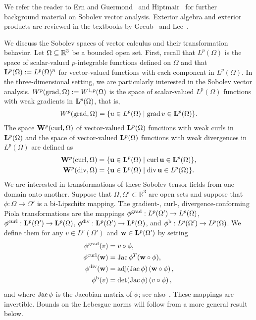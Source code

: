 \documentclass[10pt,letterpaper]{article}
\begin{document}
We refer the reader to Ern and Guermond~\cite{ern2021finite} and Hiptmair~\cite{hiptmair2002finite} for further background material on Sobolev vector analysis. 
Exterior algebra and exterior products are reviewed in the textbooks by Greub~\cite{greub1967multilinear} and Lee~\cite{lee2012smooth}.

We discuss the Sobolev spaces of vector calculus and their transformation behavior. 
Let $\Omega \subseteq {\mathbb R}^{3}$ be a bounded open set. 
First, recall that $L^{p}(\Omega)$ is the space of scalar-valued $p$-integrable functions defined on $\Omega$
and that ${\mathbf L}^{p}(\Omega) := L^{p}(\Omega)^{n}$ for vector-valued functions with each component in $L^{p}(\Omega)$. 
In the three-dimensional setting, we are particularly interested in the Sobolev vector analysis. 
$W^{p}(\operatorname{grad},\Omega) := W^{1,p}(\Omega)$ is the space of scalar-valued $L^{p}(\Omega)$ functions with weak gradients in ${\mathbf L}^{p}(\Omega)$, that is,  
\begin{gather*}
    W^{p}(\grad,\Omega) = \{ u \in L^{p}(\Omega) \suchthat \grad v \in \bfL^{p}(\Omega) \}
    .
\end{gather*}
The space ${\mathbf W}^{p}(\operatorname{curl},\Omega)$ of vector-valued ${\mathbf L}^{p}(\Omega)$ functions with weak curls in ${\mathbf L}^{p}(\Omega)$
and the space of vector-valued ${\mathbf L}^{p}(\Omega)$ functions with weak divergences in $L^{p}(\Omega)$ are defined as 
\begin{gather*}
    \bfW^{p}(\curl,\Omega) = \{ \bfu \in \bfL^{p}(\Omega) \suchthat \curl \bfu \in \bfL^{p}(\Omega) \},
    \\ 
    \bfW^{p}(\divergence,\Omega) = \{ \bfu \in \bfL^{p}(\Omega) \suchthat \divergence \bfu \in L^{p}(\Omega) \}.
\end{gather*}
We are interested in transformations of these Sobolev tensor fields from one domain onto another. 
Suppose that $\Omega, \Omega' \subset \mathbb{R}^3$ are open sets and suppose that $\phi: \Omega \to \Omega'$ is a bi-Lipschitz mapping.
The gradient-, curl-, divergence-conforming Piola transformations are the mappings 
$\phi^{\operatorname{grad}}: L^{p}(\Omega') \to L^{p}(\Omega)$,
$\phi^{\operatorname{curl}}: {\mathbf L}^{p}(\Omega') \to {\mathbf L}^{p}(\Omega)$, 
$\phi^{\operatorname{div}}: {\mathbf L}^{p}(\Omega') \to {\mathbf L}^{p}(\Omega)$,
and
$\phi^{\rm b}: L^{p}(\Omega') \to L^{p}(\Omega)$. 
We define them 
for any $v \in L^{p}(\Omega')$ and ${\mathbf w} \in {\mathbf L}^{p}(\Omega')$ by setting 
\begin{subequations}\label{eq_definition_piola}
\begin{align*}
    \phi^{\operatorname{grad}}(v) &= v \circ \phi, \\
    \phi^{\operatorname{curl}}({\mathbf w}) &= \operatorname{{\rm Jac}}\phi^{T} ({\mathbf w} \circ \phi), \\
    \phi^{\operatorname{div}}({\mathbf w}) &= \operatorname{adj}(\operatorname{{\rm Jac}}\phi) \left( {\mathbf w} \circ \phi \right), \\  
    \phi^{\rm b}(v) &= \det(\operatorname{{\rm Jac}}\phi) \left( v \circ \phi \right),
\end{align*}
\end{subequations}
and where $\operatorname{{\rm Jac}}\phi$ is the Jacobian matrix of $\phi$; see also~\cite[Definition~9.8]{ern2021finite}.
These mappings are invertible. 
Bounds on the Lebesgue norms will follow from a more general result below. 
\end{document}
